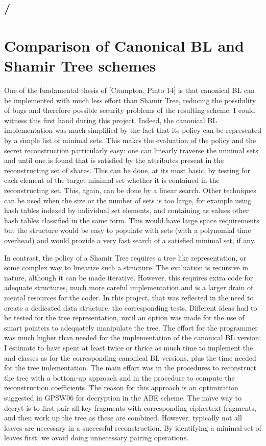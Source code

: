 \documentclass{article}
\begin{document}
\subsection{\fhshtree / \fcshtree}

\section{Comparison of Canonical BL and Shamir Tree schemes}

One of the fundamental thesis of [Crampton, Pinto 14] is that canonical BL can be implemented with much less effort than Shamir Tree, reducing the possibility of bugs and therefore possible security problems of the resulting scheme. I could witness this first hand during this project. Indeed, the canonical BL implementation was much simplified by the fact that its policy can be represented by a simple list of minimal sets. This makes the evaluation of the policy and the secret reconstruction particularly easy: one can linearly traverse the minimal sets and until one is found that is satisfied by the attributes present in the reconstructing set of shares. This can be done, at its most basic, by testing for each element of the target minimal set whether it is contained in the reconstructing set. This, again, can be done by a linear search. Other techniques can be used when the size or the number of sets is too large, for example using hash tables indexed by individual set elements, and containing as values other hash tables classified in the same form. This would have large space requirements but the structure would be easy to populate with sets (with a polynomial time overhead) and would provide a very fast search of a satisfied minimal set, if any.

In contrast, the policy of a Shamir Tree requires a tree like representation, or some complex way to linearize such a structure. The evaluation is recursive in nature, although it can be made iterative. However, this requires extra code for adequate structures, much more careful implementation and is a larger drain of mental resources for the coder. In this project, that was reflected in the need to create a dedicated data structure, the corresponding tests. Different ideas had to be tested for the tree representation, until an option was made for the use of smart pointers to adequately manipulate the tree. The effort for the programmer was much higher than needed for the implementation of the canonical BL version: I estimate to have spent at least twice or thrice as much time to implement the \cShTree and \cShTreeAP classes as for the corresponding canonical BL versions, plus the time needed for the tree imlementation. The main effort was in the procedures to reconstruct the tree with a bottom-up approach and in the procedure to compute the reconstruction coefficients.
The reason for this approach is an optimization suggested in GPSW06 for decryption in the ABE scheme. The na\"ive way to decryt is to first pair all key fragments with corresponding ciphertext fragments, and then work up the tree as these are combined. However, typically not all leaves are necessary in a successful reconstruction. By identifying a minimal set of leaves first, we avoid doing unnecessary pairing operations. 
\end{document}
